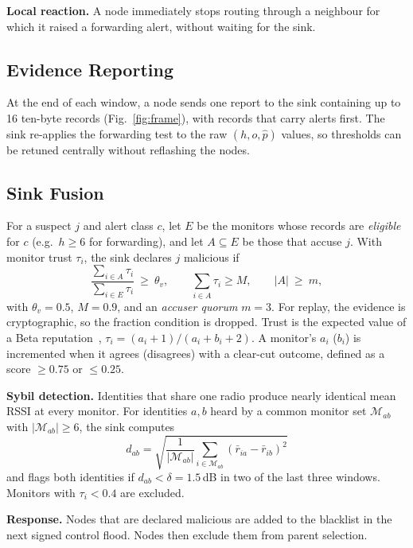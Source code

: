 \documentclass[conference]{IEEEtran}
\begin{document}
\textbf{Local reaction.} A node immediately stops routing through a neighbour
for which it raised a forwarding alert, without waiting for the sink.

\subsection{Evidence Reporting}
At the end of each window, a node sends one report to the sink containing up
to 16 ten-byte records (Fig.~\ref{fig:frame}), with records that carry alerts
first. The sink re-applies the forwarding test to the raw $(h,o,\hat p)$
values, so thresholds can be retuned centrally without reflashing the nodes.

\subsection{Sink Fusion}
For a suspect $j$ and alert class $c$, let $E$ be the monitors whose records
are \emph{eligible} for $c$ (e.g.\ $h\ge 6$ for forwarding), and let $A
\subseteq E$ be those that accuse $j$. With monitor trust $\tau_i$, the sink
declares $j$ malicious if
\begin{equation}
\frac{\sum_{i\in A}\tau_i}{\sum_{i\in E}\tau_i}\ \ge\ \theta_v,\qquad
\sum_{i\in A}\tau_i \ge M,\qquad |A|\ \ge\ m ,
\label{eq:vote}
\end{equation}
with $\theta_v=0.5$, $M=0.9$, and an \emph{accuser quorum} $m=3$. For replay,
the evidence is cryptographic, so the fraction condition is dropped. Trust is
the expected value of a Beta reputation~\cite{josang2002beta},
$\tau_i=(a_i+1)/(a_i+b_i+2)$. A monitor's $a_i$ ($b_i$) is incremented when it
agrees (disagrees) with a clear-cut outcome, defined as a score $\ge 0.75$ or
$\le 0.25$.

\textbf{Sybil detection.} Identities that share one radio produce
nearly identical mean RSSI at every monitor. For identities $a,b$ heard by a
common monitor set $\mathcal M_{ab}$ with $|\mathcal M_{ab}|\ge 6$, the sink computes
\begin{equation}
d_{ab}=\sqrt{\frac{1}{|\mathcal M_{ab}|}\sum_{i\in\mathcal M_{ab}}\left(\bar r_{ia}-\bar r_{ib}\right)^2}
\end{equation}
and flags both identities if $d_{ab}<\delta=1.5$\,dB in two of the last three
windows. Monitors with $\tau_i<0.4$ are excluded.

\textbf{Response.} Nodes that are declared malicious are added to the
blacklist in the next signed control flood. Nodes then exclude them from
parent selection.
\end{document}
